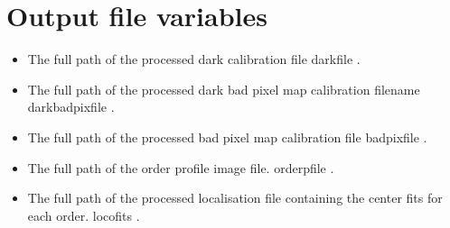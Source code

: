 \fi


\ifdevguide
\clearpage
\newpage
\section{Output file variables}
\label{ch:variables:outputvariables}

\begin{itemize}
	\item {} 
	{The full path of the processed dark calibration file}
	{darkfile}
	{\calDARK}{\spirouConst.}{\calDARK}
\end{itemize}

\begin{itemize}
	\item {} 
	{The full path of the processed dark bad pixel map calibration filename}
	{darkbadpixfile}
	{\calDARK}{\spirouConst.}{\calDARK}
\end{itemize}

\begin{itemize}
	\item {} 
	{The full path of the processed bad pixel map calibration file}
	{badpixfile}
	{\calbadpix}{\spirouConst.}{\calbadpix}
\end{itemize}

\begin{itemize}
	\item {} 
	{The full path of the order profile image file.}
	{orderpfile}
	{\callocRAW}{\spirouConst.}{\callocRAW}
\end{itemize}

\begin{itemize}
	\item {} 
	{The full path of the processed localisation file containing the center fits for each order.}
	{locofits}
	{\callocRAW}{\spirouConst.}{\callocRAW}
\end{itemize}

